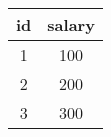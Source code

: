 \begin{tabular}{|c|c|}
    \hline
        \textbf{id} & \textbf{salary} \\ \hline
        1 & 100 \\ 
        2 & 200 \\ 
        3 & 300 \\ \hline
\end{tabular}
